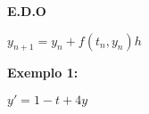\documentclass[a4paper,12pt]{article}
\begin{document}
\begin{center}
\textbf{E.D.O}
\end{center}

$y_{n+1} = y_n + f(t_n,y_n)h$

\textbf{Exemplo 1:}

$y' = 1 - t + 4y$
\end{document}
